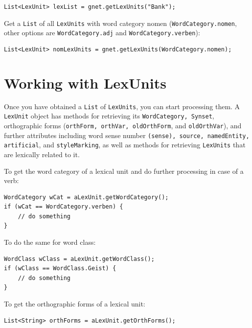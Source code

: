 \documentclass[12pt,a4paper,english,utf8]{report}
\begin{document}
\begin{lstlisting}
List<LexUnit> lexList = gnet.getLexUnits("Bank");
\end{lstlisting}

\begin{sloppypar}
Get a \texttt{List} of all \texttt{LexUnits} with word category nomen (\texttt{WordCategory.nomen}, other options are \texttt{WordCategory.adj} and \texttt{WordCategory.verben}):
\end{sloppypar}

\begin{lstlisting}
List<LexUnit> nomLexUnits = gnet.getLexUnits(WordCategory.nomen);
\end{lstlisting}



\section{Working with LexUnits}

\begin{sloppypar}
Once you have obtained a \texttt{List} of \texttt{LexUnits}, you can start processing them. A \texttt{LexUnit} object has methods for retrieving its \texttt{WordCategory, Synset}, orthographic forms (\texttt{orthForm, orthVar, oldOrthForm}, and \texttt{oldOrthVar}), and further attributes including word sense number \texttt{(sense), source, namedEntity, artificial}, and \texttt{styleMarking}, as well as methods for retrieving \texttt{LexUnits} that are lexically related to it.
\end{sloppypar}

To get the word category of a lexical unit and do further processing in case of a verb:

\begin{lstlisting}
WordCategory wCat = aLexUnit.getWordCategory();
if (wCat == WordCategory.verben) {
    // do something
}
\end{lstlisting}

To do the same for word class:

\begin{lstlisting}
WordClass wClass = aLexUnit.getWordClass();
if (wClass == WordClass.Geist) {
    // do something
}
\end{lstlisting}

To get the orthographic forms of a lexical unit:

\begin{lstlisting}
List<String> orthForms = aLexUnit.getOrthForms();
\end{lstlisting}
\end{document}
